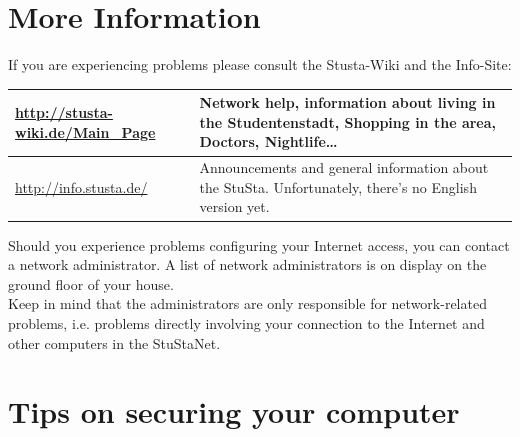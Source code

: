 \documentclass[a4paper,12pt]{scrartcl}
\begin{document}
\section*{More Information}

If you are experiencing problems please consult the Stusta-Wiki and the Info-Site:

\begin{center}
  \begin{tabularx}{\linewidth}{|lX|}
    \hline
    \url{http://stusta-wiki.de/Main_Page} & Network help, information about living in the Studentenstadt, Shopping in the area, Doctors, Nightlife\dots\\
    \hline
    \url{http://info.stusta.de/} & Announcements and general information about the StuSta. Unfortunately, there's no English version yet.\\
    \hline
  \end{tabularx}
\end{center}
Should you experience problems configuring your Internet access, you can contact a network administrator. A list of network administrators is on display on the ground floor of your house.
\\
Keep in mind that the administrators are only responsible for network-related problems, i.e. problems directly involving your connection to the Internet and other computers in the StuStaNet.


\section*{Tips on securing your computer}
\end{document}
